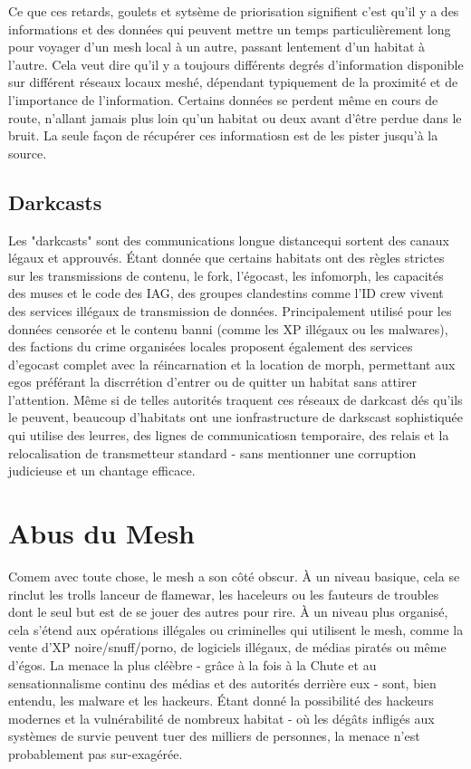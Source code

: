Ce que ces retards, goulets et sytsème de priorisation signifient c'est qu'il y a des informations et des données qui peuvent mettre un temps particulièrement long pour voyager d'un mesh local à un autre, passant lentement d'un habitat à l'autre. Cela veut dire qu'il y a toujours différents degrés d'information disponible sur différent réseaux locaux meshé, dépendant typiquement de la proximité et de l'importance de l'information. Certains données se perdent même en cours de route, n'allant jamais plus loin qu'un habitat ou deux avant d'être perdue dans le bruit. La seule façon de récupérer ces informatiosn est de les pister jusqu'à la source. 

\subsection{Darkcasts} 

Les "darkcasts" sont des communications longue distancequi sortent des canaux légaux et approuvés. Étant donnée que certains habitats ont des règles strictes sur les transmissions de contenu, le fork, l'égocast, les infomorph, les capacités des muses et le code des IAG, des groupes clandestins comme l'ID crew vivent des services illégaux de transmission de données. Principalement utilisé pour les données censorée et le contenu banni (comme les XP illégaux ou les malwares), des factions du crime organisées locales proposent également des services d'egocast complet avec la réincarnation et la location de morph, permettant aux egos préférant la discrrétion d'entrer ou de quitter un habitat sans attirer l'attention. Même si de telles autorités traquent ces réseaux de darkcast dés qu'ils le peuvent, beaucoup d'habitats ont une ionfrastructure de darkscast sophistiquée qui utilise des leurres, des lignes de communicatiosn temporaire, des relais et la relocalisation de transmetteur standard - sans mentionner une corruption judicieuse et un chantage efficace. 

\section{Abus du Mesh} 

Comem avec toute chose, le mesh a son côté obscur. À un niveau basique, cela se rinclut les trolls lanceur de flamewar, les haceleurs ou les fauteurs de troubles dont le seul but est de se jouer des autres pour rire. À un niveau plus organisé, cela s'étend aux opérations illégales ou criminelles qui utilisent le mesh, comme la vente d'XP noire/snuff/porno, de logiciels illégaux, de médias piratés ou même d'égos. La menace la plus cléèbre - grâce à la fois à la Chute et au sensationnalisme continu des médias et des autorités derrière eux - sont, bien entendu, les malware et les hackeurs. Étant donné la possibilité des hackeurs modernes et la vulnérabilité de nombreux habitat - où les dégâts infligés aux systèmes de survie peuvent tuer des milliers de personnes, la menace n'est probablement pas sur-exagérée. 

